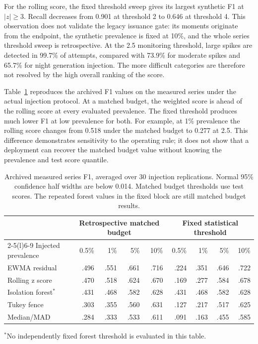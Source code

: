 \documentclass[11pt,a4paper]{article}
\begin{document}
For the rolling score, the fixed threshold sweep gives its largest synthetic F1 at $|z|\geq3$. Recall decreases from 0.901 at threshold 2 to 0.646 at threshold 4. This observation does not validate the legacy issuance gate: its moments originate from the endpoint, the synthetic prevalence is fixed at 10\%, and the whole series threshold sweep is retrospective. At the 2.5 monitoring threshold, large spikes are detected in 99.7\% of attempts, compared with 73.9\% for moderate spikes and 65.7\% for night generation injection. The more difficult categories are therefore not resolved by the high overall ranking of the score.



Table~\ref{tab:measured} reproduces the archived F1 values on the measured series under the actual injection protocol. At a matched budget, the weighted score is ahead of the rolling score at every evaluated prevalence. The fixed threshold produces much lower F1 at low prevalence for both. For example, at 1\% prevalence the rolling score changes from 0.518 under the matched budget to 0.277 at 2.5. This difference demonstrates sensitivity to the operating rule; it does not show that a deployment can recover the matched budget value without knowing the prevalence and test score quantile.

\begin{table}[tb]\centering\small
\caption{Archived measured series F1, averaged over 30 injection replications. Normal 95\% confidence half widths are below 0.014. Matched budget thresholds use test scores. The repeated forest values in the fixed block are still matched budget results.}\label{tab:measured}
\begin{tabular}{@{}lrrrrrrrr@{}}\toprule
 & \multicolumn{4}{c}{Retrospective matched budget} & \multicolumn{4}{c}{Fixed statistical threshold}\\
\cmidrule(lr){2-5}\cmidrule(l){6-9}
Injected prevalence & 0.5\% & 1\% & 5\% & 10\% & 0.5\% & 1\% & 5\% & 10\%\\\midrule
EWMA residual & .496&.551&.661&.716&.224&.351&.646&.722\\
Rolling z score & .470&.518&.624&.670&.169&.277&.584&.678\\
Isolation forest$^*$ & .431&.468&.582&.628&.431&.468&.582&.628\\
Tukey fence & .303&.355&.560&.631&.127&.217&.517&.625\\
Median/MAD & .284&.333&.533&.611&.091&.163&.455&.585\\\bottomrule
\end{tabular}
\par\smallskip\footnotesize $^*$No independently fixed forest threshold is evaluated in this table.
\end{table}
\end{document}
